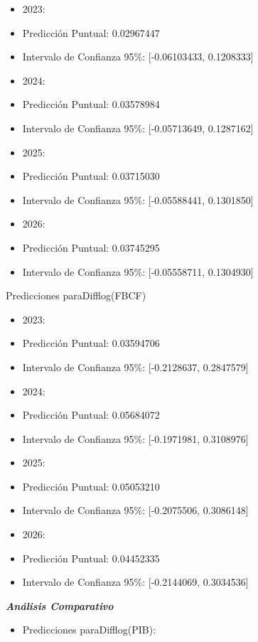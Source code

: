 \documentclass[
  12pt,
]{article}
\providecommand{\tightlist}{%
  \setlength{\itemsep}{0pt}\setlength{\parskip}{0pt}}
\begin{document}
\begin{itemize}
\item
  2023:
\item
  Predicción Puntual: 0.02967447
\item
  Intervalo de Confianza 95\%: {[}-0.06103433, 0.1208333{]}
\item
  2024:
\item
  Predicción Puntual: 0.03578984
\item
  Intervalo de Confianza 95\%: {[}-0.05713649, 0.1287162{]}
\item
  2025:
\item
  Predicción Puntual: 0.03715030
\item
  Intervalo de Confianza 95\%: {[}-0.05588441, 0.1301850{]}
\item
  2026:
\item
  Predicción Puntual: 0.03745295
\item
  Intervalo de Confianza 95\%: {[}-0.05558711, 0.1304930{]}
\end{itemize}

Predicciones paraDifflog(FBCF)

\begin{itemize}
\item
  2023:
\item
  Predicción Puntual: 0.03594706
\item
  Intervalo de Confianza 95\%: {[}-0.2128637, 0.2847579{]}
\item
  2024:
\item
  Predicción Puntual: 0.05684072
\item
  Intervalo de Confianza 95\%: {[}-0.1971981, 0.3108976{]}
\item
  2025:
\item
  Predicción Puntual: 0.05053210
\item
  Intervalo de Confianza 95\%: {[}-0.2075506, 0.3086148{]}
\item
  2026:
\item
  Predicción Puntual: 0.04452335
\item
  Intervalo de Confianza 95\%: {[}-0.2144069, 0.3034536{]}
\end{itemize}

\textbf{\emph{Análisis Comparativo}}

\begin{itemize}
\tightlist
\item
  Predicciones paraDifflog(PIB):
\end{itemize}
\end{document}
